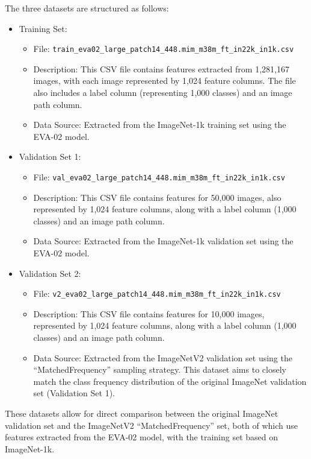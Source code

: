 \documentclass[a4paper,11pt]{article}
\begin{document}
The three datasets are structured as follows:

\begin{itemize}
    \item Training Set:
    \begin{itemize}
        \item File: \texttt{train\_eva02\_large\_patch14\_448.mim\_m38m\_ft\_in22k\_in1k.csv}
        \item Description: This CSV file contains features extracted from 1,281,167 images, with each image represented by 1,024 feature columns. The file also includes a label column (representing 1,000 classes) and an image path column.
        \item Data Source: Extracted from the ImageNet-1k training set using the EVA-02 model.
    \end{itemize}
    \item Validation Set 1:
    \begin{itemize}
        \item File: \texttt{val\_eva02\_large\_patch14\_448.mim\_m38m\_ft\_in22k\_in1k.csv}
        \item Description: This CSV file contains features for 50,000 images, also represented by 1,024 feature columns, along with a label column (1,000 classes) and an image path column.
        \item Data Source: Extracted from the ImageNet-1k validation set using the EVA-02 model.
    \end{itemize}
    \item Validation Set 2:
    \begin{itemize}
        \item File: \texttt{v2\_eva02\_large\_patch14\_448.mim\_m38m\_ft\_in22k\_in1k.csv}
        \item Description: This CSV file contains features for 10,000 images, represented by 1,024 feature columns, along with a label column (1,000 classes) and an image path column.
        \item Data Source: Extracted from the ImageNetV2 validation set using the ``MatchedFrequency'' sampling strategy. This dataset aims to closely match the class frequency distribution of the original ImageNet validation set (Validation Set 1).
    \end{itemize}
\end{itemize}

These datasets allow for direct comparison between the original ImageNet validation set and the ImageNetV2 ``MatchedFrequency'' set, both of which use features extracted from the EVA-02 model, with the training set based on ImageNet-1k.
\end{document}
